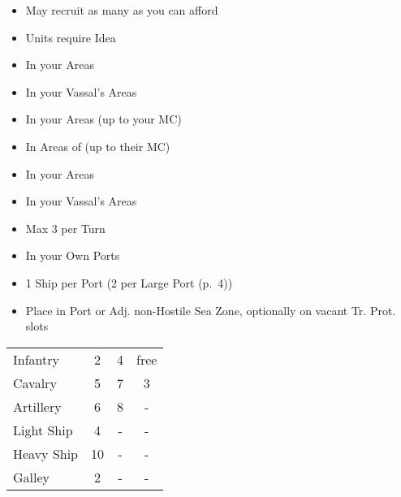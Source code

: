 \documentclass[10pt]{article}
\begin{document}
\begin{itemize}
	\item May recruit as many as you can afford
	\item {} Units require  Idea 
\end{itemize}
\begin{itemize}
	\item In your Areas
	\item In your Vassal's Areas
\end{itemize}
\begin{itemize}
	\item In your Areas (up to your MC)
	\item In Areas of \activeallies (up to their MC)
\end{itemize}
\begin{itemize}
	\item In your Areas
	\item In your Vassal's Areas
	\item Max 3 per Turn
\end{itemize}
\begin{itemize}
	\item In your Own Ports
	\item 1 Ship per Port (2 per Large Port (p.~4))
	\item Place in Port or Adj. non-Hostile Sea Zone, optionally on vacant Tr. Prot. slots
\end{itemize}
\begin{tabularx}{\columnwidth}{ | l | C | C | C | }
	\hline
	\null &   &   &   \\ \hline
	Infantry &  2\ducats &  4\ducats &  free \\ \hline
	Cavalry &  5\ducats &  7\ducats &  3\ducats \\ \hline
	Artillery &  6\ducats &  8\ducats & - \\ \hline
	Light Ship & 4\ducats & - & - \\ \hline
	Heavy Ship & 10\ducats & - & - \\ \hline
	Galley & 2\ducats & - & - \\ \hline
\end{tabularx}
\end{document}
